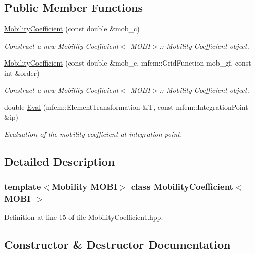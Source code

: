 \subsection*{Public Member Functions}
\begin{DoxyCompactItemize}
\item 
\hyperlink{classMobilityCoefficient_a9c91c5b213b6a7c15977fd6d660cb7ed}{Mobility\+Coefficient} (const double \&mob\+\_\+c)
\begin{DoxyCompactList}\small\item\em Construct a new Mobility Coefficient$<$ M\+O\+B\+I$>$\+:\+: Mobility Coefficient object. \end{DoxyCompactList}\item 
\hyperlink{classMobilityCoefficient_a12dab2f5b95a5ab5f6cb01c2d2b5c65c}{Mobility\+Coefficient} (const double \&mob\+\_\+c, mfem\+::\+Grid\+Function mob\+\_\+gf, const int \&order)
\begin{DoxyCompactList}\small\item\em Construct a new Mobility Coefficient$<$ M\+O\+B\+I$>$\+:\+: Mobility Coefficient object. \end{DoxyCompactList}\item 
double \hyperlink{classMobilityCoefficient_a114ed4ca6b17eb4c23c572d6f802c7b2}{Eval} (mfem\+::\+Element\+Transformation \&T, const mfem\+::\+Integration\+Point \&ip)
\begin{DoxyCompactList}\small\item\em Evaluation of the mobility coefficient at integration point. \end{DoxyCompactList}\end{DoxyCompactItemize}


\subsection{Detailed Description}
\subsubsection*{template$<$Mobility M\+O\+BI$>$\newline
class Mobility\+Coefficient$<$ M\+O\+B\+I $>$}



Definition at line 15 of file Mobility\+Coefficient.\+hpp.



\subsection{Constructor \& Destructor Documentation}
\mbox{\label{classMobilityCoefficient_a9c91c5b213b6a7c15977fd6d660cb7ed}} 
